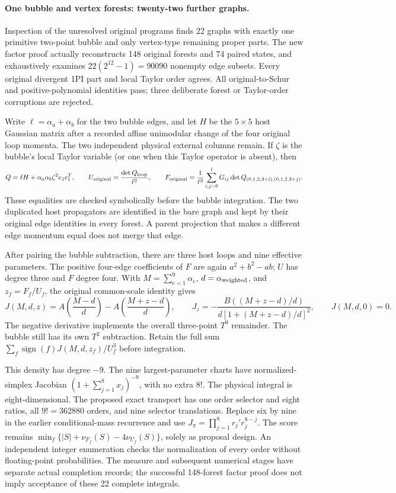 \documentclass[11pt]{article}
\begin{document}
\paragraph{One bubble and vertex forests: twenty-two further graphs.}
Inspection of the unresolved original programs finds 22 graphs with exactly
one primitive two-point bubble and only vertex-type remaining proper parts.
The new factor proof actually reconstructs 148 original forests and 74 paired
states, and exhaustively examines \(22(2^{12}-1)=90090\) nonempty edge subsets.
Every original divergent 1PI part and local Taylor order agrees.
All original-to-Schur and positive-polynomial identities pass; three
deliberate forest or Taylor-order corruptions are rejected.

Write \(\ell=\alpha_a+\alpha_b\) for the two bubble edges, and let
\(H\) be the \(5\times5\) host Gaussian matrix after a recorded affine
unimodular change of the four original loop momenta. The two independent
physical external columns remain. If \(\zeta\) is the bubble's local Taylor
variable (or one when this Taylor operator is absent), then
\[
 Q=\ell H+\alpha_a\alpha_b\zeta^2 e_1e_1^T,\qquad
 U_{\rm original}=\frac{\det Q_{\rm loop}}{\ell^2},\qquad
 F_{\rm original}=\frac1{\ell^3}
       \sum_{i,j=0}^1G_{ij}\det Q_{(0,1,2,3+i),(0,1,2,3+j)}.
\]
These equalities are checked symbolically before the bubble integration.
The two duplicated host propagators are identified in the bare graph and
kept by their original edge identities in every forest. A parent projection
that makes a different edge momentum equal does not merge that edge.

After pairing the bubble subtraction, there are three host loops and nine
effective parameters. The positive four-edge coefficients of \(F\) are
again \(a^2+b^2-ab\); \(U\) has degree three and \(F\) degree four.
With \(M=\sum_{e=1}^9\alpha_e\), \(d=\alpha_{\rm weighted}\),
and \(z_f=F_f/U_f\), the original common-scale identity gives
\[
 J(M,d,z)=A\!\left(\frac{M-d}{d}\right)
          -A\!\left(\frac{M+z-d}{d}\right),\qquad
 J_z=-\frac{B((M+z-d)/d)}{d[1+(M+z-d)/d]^2},\qquad J(M,d,0)=0.
\]
The negative derivative implements the overall three-point \(T^0\)
remainder. The bubble still has its own \(T^2\) subtraction. Retain the full
sum \(\sum_f\operatorname{sign}(f)J(M,d,z_f)/U_f^3\) before integration.

This density has degree \(-9\). The nine largest-parameter charts have
normalized-simplex Jacobian \((1+\sum_{j=1}^8x_j)^{-9}\), with no extra
\(8!\). The physical integral is eight-dimensional. The proposed exact
transport has one order selector and eight ratios, all \(9!=362880\)
orders, and nine selector translations. Replace six by nine in the earlier
conditional-mass recurrence and use
\(J_\pi=\prod_{j=1}^8r_j' r_j^{8-j}\). The score remains
\(\min_f\{|S|+\nu_{F_f}(S)-4\nu_{U_f}(S)\}\), solely as proposal design.
An independent integer enumeration checks the normalization of every order
without floating-point probabilities. The measure and subsequent numerical
stages have separate actual completion records; the successful 148-forest
factor proof does not imply acceptance of these 22 complete integrals.
\end{document}
